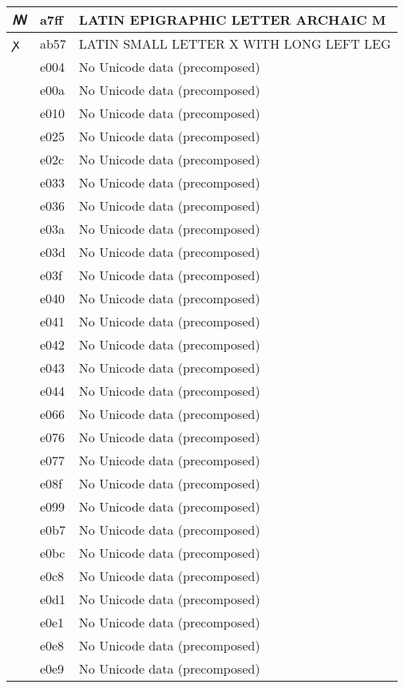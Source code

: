 \documentclass[12pt,letterpaper,openany]{book}
\begin{document}
\begin{center}
\begin{supertabular}{|m{0.25in}|m{0.5in}|m{4in}|}
			ꟿ & a7ff & LATIN EPIGRAPHIC LETTER ARCHAIC M\\\hline
			ꭗ & ab57 & LATIN SMALL LETTER X WITH LONG LEFT LEG\\\hline
			 & e004 & No Unicode data (precomposed)\\\hline
			 & e00a & No Unicode data (precomposed)\\\hline
			 & e010 & No Unicode data (precomposed)\\\hline
			 & e025 & No Unicode data (precomposed)\\\hline
			 & e02c & No Unicode data (precomposed)\\\hline
			 & e033 & No Unicode data (precomposed)\\\hline
			 & e036 & No Unicode data (precomposed)\\\hline
			 & e03a & No Unicode data (precomposed)\\\hline
			 & e03d & No Unicode data (precomposed)\\\hline
			 & e03f & No Unicode data (precomposed)\\\hline
			 & e040 & No Unicode data (precomposed)\\\hline
			 & e041 & No Unicode data (precomposed)\\\hline
			 & e042 & No Unicode data (precomposed)\\\hline
			 & e043 & No Unicode data (precomposed)\\\hline
			 & e044 & No Unicode data (precomposed)\\\hline
			 & e066 & No Unicode data (precomposed)\\\hline
			 & e076 & No Unicode data (precomposed)\\\hline
			 & e077 & No Unicode data (precomposed)\\\hline
			 & e08f & No Unicode data (precomposed)\\\hline
			 & e099 & No Unicode data (precomposed)\\\hline
			 & e0b7 & No Unicode data (precomposed)\\\hline
			 & e0bc & No Unicode data (precomposed)\\\hline
			 & e0c8 & No Unicode data (precomposed)\\\hline
			 & e0d1 & No Unicode data (precomposed)\\\hline
			 & e0e1 & No Unicode data (precomposed)\\\hline
			 & e0e8 & No Unicode data (precomposed)\\\hline
			 & e0e9 & No Unicode data (precomposed)\\\hline

\end{supertabular}
\end{center}
\end{document}

